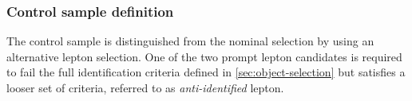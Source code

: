 \subsubsection{Control sample definition}
The control sample is distinguished from the nominal selection by using an alternative lepton selection.
One of the two prompt lepton candidates is required to fail the full identification criteria defined in \cref{sec:object-selection} but satisfies a looser set of criteria, referred to as \emph{anti-identified} lepton.
